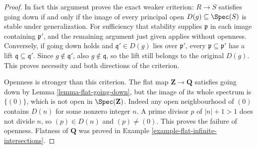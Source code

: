 \begin{proof}
In fact this argument proves the exact weaker criterion:
$R\to S$ satisfies going down if and only if the image
of every principal open $D(g)\subseteq\Spec(S)$ is stable
under generalization. For sufficiency that stability
supplies $\mathfrak p$ in each image containing
$\mathfrak p'$, and the remaining argument just given
applies without openness. Conversely, if going down
holds and $\mathfrak q'\in D(g)$ lies over
$\mathfrak p'$, every $\mathfrak p\subseteq\mathfrak p'$
has a lift $\mathfrak q\subseteq\mathfrak q'$.
Since $g\notin\mathfrak q'$, also $g\notin\mathfrak q$,
so the lift still belongs to the original $D(g)$.
This proves necessity and both directions of the criterion.

Openness is stronger than this criterion. The flat map
$\mathbf Z\to\mathbf Q$ satisfies going down by
Lemma \ref{lemma-flat-going-down}, but the image of its
whole spectrum is $\{(0)\}$, which is not open in
$\Spec(\mathbf Z)$. Indeed any open neighbourhood of
$(0)$ contains $D(n)$ for some nonzero integer $n$.
A prime divisor $p$ of $|n|+1>1$ does not divide $n$,
so $(p)\in D(n)$ and $(p)\ne(0)$. This proves the
failure of openness. Flatness of $\mathbf Q$ was proved
in Example \ref{example-flat-infinite-intersections}.
\end{proof}